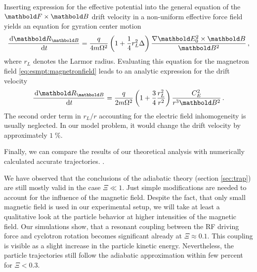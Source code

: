Inserting expression for the effective potential
into the general equation of the $\mb F\times \mb B$ 
drift velocity in a non-uniform
effective force field \citep{baumjohan2012} yields an equation
for gyration center motion 
\begin{equation}
\frac{\de \mb R_{\mb B}}{\de t} = 
\frac{q}{4m\Omega^2}
\left(1+\frac{1}{4}r_L^2\Delta\right)
\frac{\nabla\mb E_0^2\times\mb B}{\mb B^2}\,,
\end{equation}
where $r_L$ denotes the Larmor radius.
Evaluating this equation
for the magnetron field \eqref{eq:esmpt:magnetronfield} leads
to an analytic expression for the drift velocity
\begin{equation}
\frac{\de \mb R_{\mb B}}{\de t} = 
\frac{q}{2m\Omega^2}
\left(1+\frac{3}{4}\frac{r_L^2}{r^2}\right)
\frac{C_E^2}{r^3\mb B^2}\,.
\end{equation}
The second order term in $r_L/r$ accounting for the electric field
inhomogeneity is usually neglected. In our model problem, it would
change the drift velocity by approximately $1\;\%$.

Finally, we can compare the results of our theoretical analysis with
numerically calculated accurate trajectories.
.

We have observed that the conclusions of the
adiabatic theory (section \ref{sec:trap}) are still mostly
valid in the case $\Xi \ll 1$.
Just simple modifications are needed to account
for the influence of the magnetic field. Despite the fact, that
only small magnetic field is used in our experimental setup, we
will take at least a qualitative look at the particle behavior
at higher intensities of the magnetic field. Our simulations
show, that a resonant coupling between the \ac{RF} driving
force and cyclotron rotation becomes significant already at
$\Xi\approx0.1$. This coupling is visible as a slight increase
in the particle kinetic energy. Nevertheless, the particle
trajectories still follow the adiabatic approximation within
few percent for $\Xi<0.3$.

